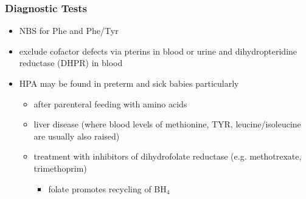 \documentclass{scrartcl}
\begin{document}
\subsubsection{Diagnostic Tests}
\label{sec:org7f0c778}
\begin{itemize}
\item NBS for Phe and Phe/Tyr
\item exclude cofactor defects via pterins in blood or urine and
dihydropteridine reductase (DHPR) in blood
\item HPA may be found in preterm and sick babies particularly
\begin{itemize}
\item after parenteral feeding with amino acids
\item liver disease (where blood levels of methionine, TYR,
leucine/isoleucine are usually also raised)
\item treatment with inhibitors of dihydrofolate reductase (e.g. methotrexate, trimethoprim)
\begin{itemize}
\item folate promotes recycling of BH\(_{\text{4}}\)
\end{itemize}
\end{itemize}
\end{itemize}
\end{document}
